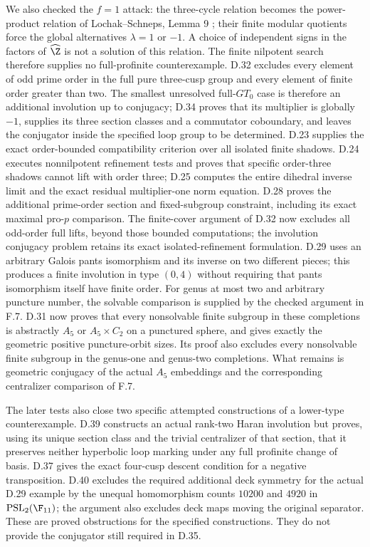 We also checked the $f=1$ attack: the three-cycle relation becomes the power-product relation of Lochak--Schneps, Lemma 9 \cite{R-LS}; their finite modular quotients force the global alternatives $\lambda=1$ or $-1$. A choice of independent signs in the factors of $\widehat\Z$ is not a solution of this relation. The finite nilpotent search therefore supplies no full-profinite counterexample. D.32 excludes every element of odd prime order in the full pure three-cusp group and every element of finite order greater than two. The smallest unresolved full-$GT_0$ case is therefore an additional involution up to conjugacy; D.34 proves that its multiplier is globally $-1$, supplies its three section classes and a commutator coboundary, and leaves the conjugator inside the specified loop group to be determined. D.23 supplies the exact order-bounded compatibility criterion over all isolated finite shadows. D.24 executes nonnilpotent refinement tests and proves that specific order-three shadows cannot lift with order three; D.25 computes the entire dihedral inverse limit and the exact residual multiplier-one norm equation. D.28 proves the additional prime-order section and fixed-subgroup constraint, including its exact maximal pro-$p$ comparison. The finite-cover argument of D.32 now excludes all odd-order full lifts, beyond those bounded computations; the involution conjugacy problem retains its exact isolated-refinement formulation. D.29 uses an arbitrary Galois pants isomorphism and its inverse on two different pieces; this produces a finite involution in type $(0,4)$ without requiring that pants isomorphism itself have finite order. For genus at most two and arbitrary puncture number, the solvable comparison is supplied by the checked argument in F.7. D.31 now proves that every nonsolvable finite subgroup in these completions is abstractly $A_5$ or $A_5\times C_2$ on a punctured sphere, and gives exactly the geometric positive puncture-orbit sizes. Its proof also excludes every nonsolvable finite subgroup in the genus-one and genus-two completions. What remains is geometric conjugacy of the actual $A_5$ embeddings and the corresponding centralizer comparison of F.7.

The later tests also close two specific attempted constructions of a lower-type counterexample. D.39 constructs an actual rank-two Haran involution but proves, using its unique section class and the trivial centralizer of that section, that it preserves neither hyperbolic loop marking under any full profinite change of basis. D.37 gives the exact four-cusp descent condition for a negative transposition. D.40 excludes the required additional deck symmetry for the actual D.29 example by the unequal homomorphism counts $10200$ and $4920$ in $\operatorname{PSL}_2(\F_{11})$; the argument also excludes deck maps moving the original separator. These are proved obstructions for the specified constructions. They do not provide the conjugator still required in D.35.

